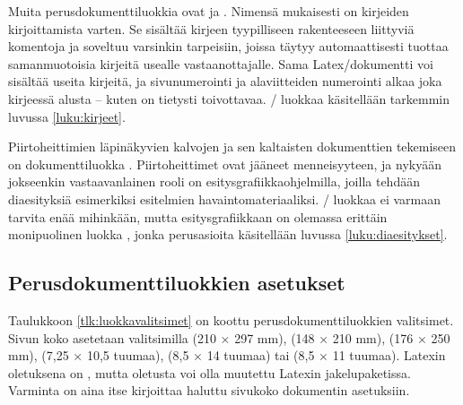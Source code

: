 Muita perusdokumenttiluokkia ovat  ja .
Nimensä mukaisesti  on kirjeiden kirjoittamista varten.
Se sisältää kirjeen tyypilliseen rakenteeseen liittyviä komentoja ja
soveltuu varsinkin tarpeisiin, joissa täytyy automaattisesti tuottaa
samanmuotoisia kirjeitä usealle vastaanottajalle. Sama
Latex\-/dokumentti voi sisältää useita kirjeitä, ja sivunumerointi ja
alaviitteiden numerointi alkaa joka kirjeessä alusta -- kuten on
tietysti toivottavaa. \-/ luokkaa käsitellään tarkemmin
luvussa \ref{luku:kirjeet}.

Piirtoheittimien läpinäkyvien kalvojen ja sen kaltaisten dokumenttien
tekemiseen on dokumenttiluokka . Piirtoheittimet ovat
jääneet menneisyyteen, ja nykyään jokseenkin vastaavanlainen rooli on
esitysgrafiikkaohjelmilla, joilla tehdään diaesityksiä esimerkiksi
esitelmien havaintomateriaaliksi. \-/ luokkaa ei varmaan
tarvita enää mihinkään, mutta esitysgrafiikkaan on olemassa erittäin
monipuolinen luokka , jonka perusasioita käsitellään
luvussa \ref{luku:diaesitykset}.

\subsection{Perusdokumenttiluokkien asetukset}

Taulukkoon \ref{tlk:luokkavalitsimet} on koottu perusdokumenttiluokkien
valitsimet. Sivun koko asetetaan valitsimilla  (210 ×
297 mm),   (148 × 210 mm),
 (176 × 250 mm),  (7,25 ×
10,5 tuumaa),  (8,5 × 14 tuumaa) tai
 (8,5 × 11 tuumaa). Latexin oletuksena on
, mutta oletusta voi olla muutettu Latexin
jakelupaketissa. Varminta on aina itse kirjoittaa haluttu sivukoko
dokumentin asetuksiin.


